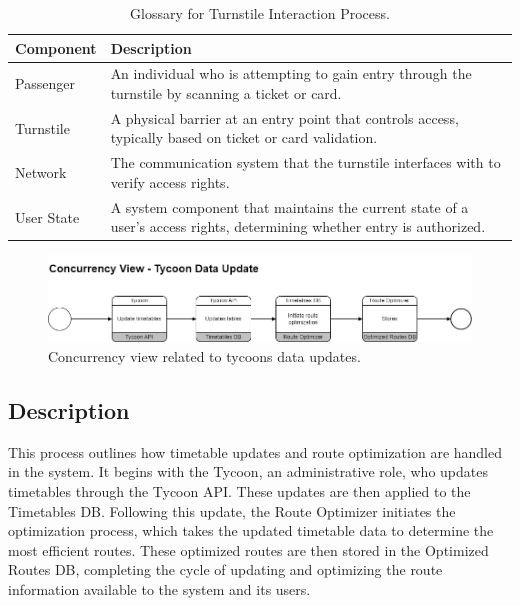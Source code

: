 \begin{table}[H]
    \centering
    \caption{Glossary for Turnstile Interaction Process.}
    \label{tab:turnstile_interaction_glossary}
    \begin{tabularx}{\textwidth}{@{}lX@{}} %
    \toprule
    \textbf{Component} & \textbf{Description} \\
    \midrule
    Passenger & An individual who is attempting to gain entry through the turnstile by scanning a ticket or card. \\
    Turnstile & A physical barrier at an entry point that controls access, typically based on ticket or card validation. \\
    Network & The communication system that the turnstile interfaces with to verify access rights. \\
    User State & A system component that maintains the current state of a user's access rights, determining whether entry is authorized. \\
    \bottomrule
    \end{tabularx}
\end{table}

\begin{figure}[H]
    \centering
    \includegraphics[width=\textwidth]{drawings/views_final_version/concurrency_view_3.png}
    \caption{Concurrency view related to tycoons data updates.}
    \label{fig:concurrency_view_3}
\end{figure}

\subsection*{Description}
This process outlines how timetable updates and route optimization are handled in the system. It begins with the Tycoon, an administrative role, who updates timetables through the Tycoon API. These updates are then applied to the Timetables DB. Following this update, the Route Optimizer initiates the optimization process, which takes the updated timetable data to determine the most efficient routes. These optimized routes are then stored in the Optimized Routes DB, completing the cycle of updating and optimizing the route information available to the system and its users.

